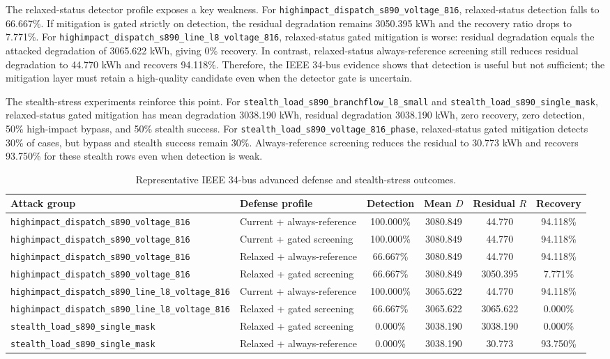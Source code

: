 The relaxed-status detector profile exposes a key weakness. For \texttt{highimpact\_dispatch\_s890\_voltage\_816}, relaxed-status detection falls to 66.667\%. If mitigation is gated strictly on detection, the residual degradation remains 3050.395 kWh and the recovery ratio drops to 7.771\%. For \texttt{highimpact\_dispatch\_s890\_line\_l8\_voltage\_816}, relaxed-status gated mitigation is worse: residual degradation equals the attacked degradation of 3065.622 kWh, giving 0\% recovery. In contrast, relaxed-status always-reference screening still reduces residual degradation to 44.770 kWh and recovers 94.118\%. Therefore, the IEEE 34-bus evidence shows that detection is useful but not sufficient; the mitigation layer must retain a high-quality candidate even when the detector gate is uncertain.

The stealth-stress experiments reinforce this point. For \texttt{stealth\_load\_s890\_branchflow\_l8\_small} and \texttt{stealth\_load\_s890\_single\_mask}, relaxed-status gated mitigation has mean degradation 3038.190 kWh, residual degradation 3038.190 kWh, zero recovery, zero detection, 50\% high-impact bypass, and 50\% stealth success. For \texttt{stealth\_load\_s890\_voltage\_816\_phase}, relaxed-status gated mitigation detects 30\% of cases, but bypass and stealth success remain 30\%. Always-reference screening reduces the residual to 30.773 kWh and recovers 93.750\% for these stealth rows even when detection is weak.

\begin{table}[t]
\centering
\caption{Representative IEEE 34-bus advanced defense and stealth-stress outcomes.}
\label{tab:ieee34_advanced_defense}
\scriptsize
\begin{tabular}{llcccc}
\hline
Attack group & Defense profile & Detection & Mean $D$ & Residual $R$ & Recovery \\
\hline
\texttt{highimpact\_dispatch\_s890\_voltage\_816} & Current + always-reference & 100.000\% & 3080.849 & 44.770 & 94.118\% \\
\texttt{highimpact\_dispatch\_s890\_voltage\_816} & Current + gated screening & 100.000\% & 3080.849 & 44.770 & 94.118\% \\
\texttt{highimpact\_dispatch\_s890\_voltage\_816} & Relaxed + always-reference & 66.667\% & 3080.849 & 44.770 & 94.118\% \\
\texttt{highimpact\_dispatch\_s890\_voltage\_816} & Relaxed + gated screening & 66.667\% & 3080.849 & 3050.395 & 7.771\% \\
\texttt{highimpact\_dispatch\_s890\_line\_l8\_voltage\_816} & Current + always-reference & 100.000\% & 3065.622 & 44.770 & 94.118\% \\
\texttt{highimpact\_dispatch\_s890\_line\_l8\_voltage\_816} & Relaxed + gated screening & 66.667\% & 3065.622 & 3065.622 & 0.000\% \\
\texttt{stealth\_load\_s890\_single\_mask} & Relaxed + gated screening & 0.000\% & 3038.190 & 3038.190 & 0.000\% \\
\texttt{stealth\_load\_s890\_single\_mask} & Relaxed + always-reference & 0.000\% & 3038.190 & 30.773 & 93.750\% \\
\hline
\end{tabular}
\end{table}

